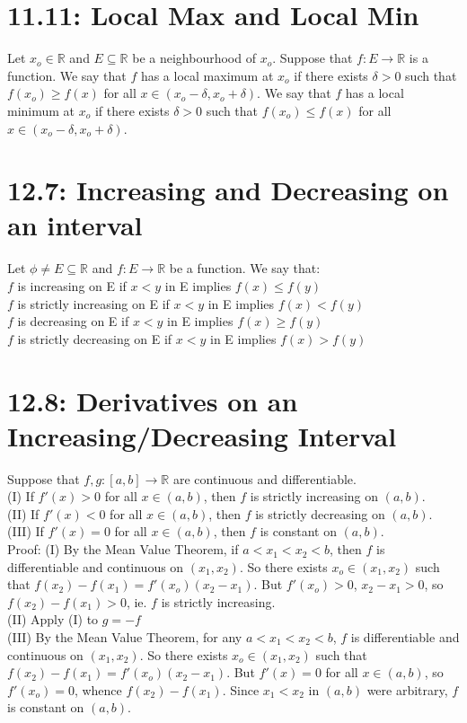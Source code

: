 \documentclass[10pt,letter]{report}
\begin{document}
\section*{11.11: Local Max and Local Min}
Let $x_o\in\mathbb{R}$ and $E\subseteq\mathbb{R}$ be a neighbourhood of $x_o$. Suppose that $f:E\rightarrow\mathbb{R}$ is a function. We say that $f$ has a local maximum at $x_o$ if there exists $\delta>0$ such that $f(x_o)\geq f(x)$ for all $x\in(x_o-\delta, x_o+\delta)$. We say that $f$ has a local minimum at $x_o$ if there exists $\delta>0$ such that $f(x_o)\leq f(x)$ for all $x\in(x_o-\delta,x_o+\delta)$.

\section*{12.7: Increasing and Decreasing on an interval}
Let $\phi\neq E\subseteq\mathbb{R}$ and $f:E\rightarrow\mathbb{R}$ be a function. We say that: \\ 
$f$  is increasing on E if $x<y$ in E implies $f(x)\leq f(y)$\\
$f$  is strictly increasing on E if $x<y$ in E implies $f(x)< f(y)$\\
$f$  is decreasing on E if $x<y$ in E implies $f(x)\geq f(y)$\\
$f$  is strictly decreasing on E if $x<y$ in E implies $f(x)> f(y)$\\ 

\section*{12.8: Derivatives on an Increasing/Decreasing Interval}
Suppose that $f,g:[a,b]\rightarrow\mathbb{R}$ are continuous and differentiable. \\ 
(I) If $f'(x)>0$ for all $x\in(a,b)$, then $f$ is strictly increasing on $(a,b)$. \\ 
(II) If $f'(x)<0$ for all $x\in(a,b)$, then $f$ is strictly decreasing on $(a,b)$. \\ 
(III) If $f'(x)=0$ for all $x\in(a,b)$, then $f$ is constant on $(a,b)$. \\ 
Proof: (I) By the Mean Value Theorem, if $a<x_1<x_2<b$, then $f$ is differentiable and continuous on $(x_1,x_2)$. So there exists $x_o\in(x_1,x_2)$ such that $f(x_2)-f(x_1)=f'(x_o)(x_2-x_1)$. But $f'(x_o)>0$, $x_2-x_1>0$, so $f(x_2)-f(x_1)>0$, ie. $f$ is strictly increasing. \\ 
(II) Apply (I) to $g=-f$ \\ 
(III) By the Mean Value Theorem, for any $a<x_1<x_2<b$, $f$ is differentiable and continuous on $(x_1,x_2)$. So there exists $x_o\in(x_1,x_2)$ such that $f(x_2)-f(x_1)=f'(x_o)(x_2-x_1)$. But $f'(x)=0$ for all $x\in(a,b)$, so $f'(x_o)=0$, whence $f(x_2)-f(x_1)$. Since $x_1<x_2$ in $(a,b)$ were arbitrary, $f$ is constant on $(a,b)$. 
\end{document}
